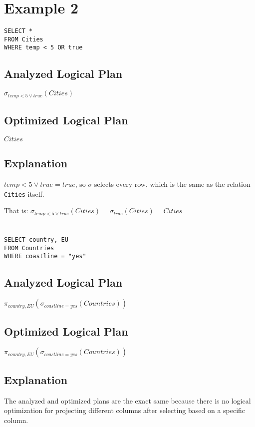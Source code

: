 \documentclass[12pt]{article}
\begin{document}
\newpage

\section*{Example 2}
\begin{verbatim}
SELECT *
FROM Cities
WHERE temp < 5 OR true
\end{verbatim}

\subsection*{Analyzed Logical Plan}
$\sigma_{temp < 5 \vee true}(Cities)$

\subsection*{Optimized Logical Plan}
$Cities$

\subsection*{Explanation}
$temp < 5 \vee true = true$, so $\sigma$ selects every row,
which is the same as the relation \verb|Cities| itself.

That is:
$\sigma_{temp < 5 \vee true}(Cities) = \sigma_{true}(Cities) = Cities$

\newpage

\section{}
\begin{verbatim}
SELECT country, EU
FROM Countries
WHERE coastline = "yes"
\end{verbatim}

\subsection*{Analyzed Logical Plan}
$\pi_{country, EU}(\sigma_{coastline = yes}(Countries))$

\subsection*{Optimized Logical Plan}
$\pi_{country, EU}(\sigma_{coastline = yes}(Countries))$

\subsection*{Explanation}
The analyzed and optimized plans are the exact same because there is no logical optimization
for projecting different columns after selecting based on a specific column.
\newpage
\end{document}
